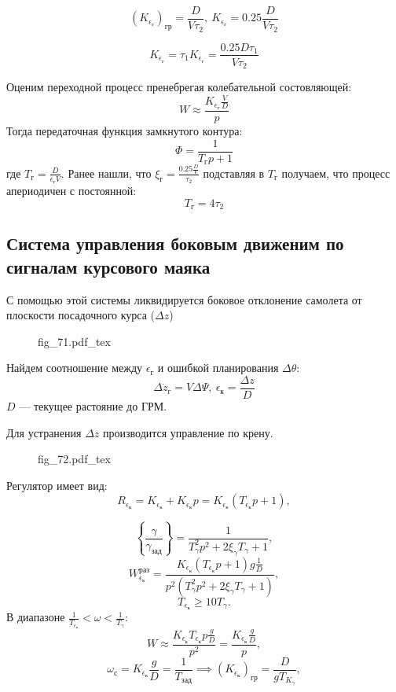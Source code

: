 \documentclass{article}
\newcommand{\incfig}[1]{
    {#1.pdf_tex}
}
\begin{document}
\[
    (K_{\epsilon_\text{г}})_\text{гр} = \frac{D}{V \tau_2}, \ K_{\epsilon_\text{г}} = 0.25 \frac{D}{V \tau_2}
\]

\[
    K_{\dot{\epsilon}_{\text{г}}} = \tau_1 K_{\epsilon_\text{г}} = \frac{0.25 D \tau_1}{V \tau_2}
\]

Оценим переходной процесс пренебрегая колебательной состовляющей:
\[
    W \approx \frac{K_{\epsilon_\text{г}} \frac{V}{D}}{p}
\]
Тогда передаточная функция замкнутого контура:
\[
    \Phi = \frac{1}{T_\text{г} p + 1}
\]
где $T_\text{г} = \frac{D}{\epsilon_\text{г} V}$.
Ранее нашли, что $\xi_\text{г} = \frac{0.25 \frac{D}{V}}{\tau_2}$ подставляя в $T_\text{г}$ получаем, что процесс апериодичен с постоянной:
\[
    T_\text{г} = 4 \tau_2
\]

\subsection{Система управления боковым движеним по сигналам курсового маяка}
С помощью этой системы ликвидируется боковое отклонение самолета от плоскости посадочного курса ($\Delta z$)
\begin{figure}[H]
    \centering
    \incfig{fig_71}
    \label{fig:fig_71}
\end{figure}
Найдем соотношение между $\epsilon_\text{г}$ и ошибкой планирования $\Delta \theta$:
\[
    \Delta \dot{z}_\text{г} = V \Delta \Psi, \ \epsilon_\text{к} = \frac{\Delta z}{D}
\]
$D$ --- текущее растояние до ГРМ.

Для устранения $\Delta z$ производится управление по крену.
\begin{figure}[H]
    \centering
    \incfig{fig_72}
    \label{fig:fig_72}
\end{figure}
Регулятор имеет вид: 
\[
R_{\epsilon_\text{к}} = K_{\epsilon_\text{к}} + K_{\dot{\epsilon}_{\text{к}}} p = K_{\epsilon_\text{к}}(T_{\epsilon_\text{к}} p + 1),
\]

\[
    \left\{ \frac{\gamma}{\gamma_\text{зад}} \right\} = \frac{1}{ T_\gamma^2 p^2 + 2 \xi_\gamma T_\gamma + 1},
\]
\[
    W_{\epsilon_\text{к}}^\text{раз} = \frac{K_{\epsilon_\text{к}} (T_{\epsilon_\text{к}} p + 1) g \frac{1}{D}}{ p^2 ( T_\gamma^2 p^2 + 2 \xi_\gamma T_\gamma + 1)},
\]
\[
    T_{\epsilon_\text{к}} \ge 10 T_\gamma.
\]
В диапазоне $\frac{1}{T_{\epsilon_\text{к}}} < \omega < \frac{1}{T_\gamma}$:
\[
    W \approx \frac{K_{\epsilon_\text{к}} T_{\epsilon_\text{к}} p \frac{g}{D}}{p^2} = \frac{K_{\dot{\epsilon}_{\text{к}}} \frac{g}{D}}{p},
\]
\[
\omega_{\text{с}} = K_{\dot{\epsilon}_{\text{к}}} \frac{g}{D} = \frac{1}{T_{\text{зад}}} \implies (K_{\dot{\epsilon}_{\text{к}}})_{\text{гр}} = \frac{D}{g T_{K_{\gamma}}} ,
\]
\end{document}
